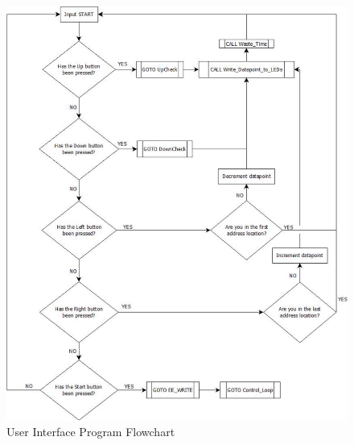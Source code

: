 \documentclass[10pt, twocolumn]{article}
\begin{document}
\begin{figure}
	\centering
	\includegraphics[width=1\textwidth]{Figures/user-interface-flowchart.pdf}
	\caption{User Interface Program Flowchart}
	\label{user-interface-flowchart}
\end{figure}
\end{document}
